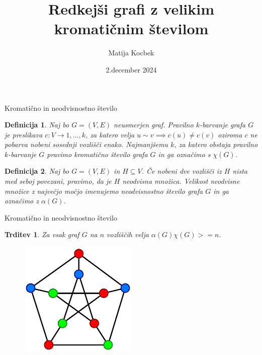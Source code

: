 \documentclass[t]{beamer} %
\title{Redkejši grafi z velikim kromatičnim številom}
\author{Matija Kocbek}
\institute{mentor: prof.~dr.~Riste Škrekovski}
\date{2.\;december 2024}
\newtheorem{definicija}{Definicija}
\newtheorem{trditev}{Trditev}
\newcommand{\fillblack}[1]{
\begin{tikzpicture}[remember picture, overlay]
    \node [shift={(0 cm,0cm)}]  at (current page.south west)
        {%
        \begin{tikzpicture}[remember picture, overlay] at (current page.south west)
            \draw [fill=black] (0, 0) -- (0,#1 \paperheight) --
                              (\paperwidth,#1 \paperheight) -- (\paperwidth,0) -- cycle ;
        \end{tikzpicture}
        };
        \draw (current page.north west) rectangle (current page.south east);
\end{tikzpicture}
}
\begin{document}
\begin{frame}
  \maketitle
\end{frame}

\begin{frame}[fragile]{Kromatično in neodvisnostno število}
  \begin{definicija}
    Naj bo $G = (V, E)$ neusmerjen graf. Pravilno $k$-barvanje grafa $G$ je preslikava $c: V \to {1, \ldots, k}$, za katero velja $u \sim v \implies c(u) \neq c(v)$
    oziroma $c$ ne pobarva nobeni sosednji vozlišči enako. Najmanjšemu $k$, za katero obstaja pravilno $k$-barvanje $G$ pravimo kromatično število grafa $G$ in ga
    označimo s $\chi(G)$.
  \end{definicija}
  \pause
  \begin{definicija}
    Naj bo $G = (V, E)$ in $H \subseteq V$. Če nobeni dve vozlišči iz $H$ nista med seboj povezani, pravimo, da je $H$ neodvisna množica. Velikost neodvisne množice
    z največjo močjo imenujemo neodvisnostno število grafa $G$ in ga označimo z $\alpha(G)$.
  \end{definicija}
\end{frame}

\begin{frame}{Kromatično in neodvisnostno število}
  \begin{trditev}
    Za vsak graf $G$ na $n$ vozliščih velja $\alpha(G)\chi(G) >= n$.
  \end{trditev}
  \begin{figure}
    \centering
    \includegraphics[width=0.5\textwidth]{Petersen_graph_3-coloring.svg.png}
  \end{figure}
\end{frame}
\end{document}
